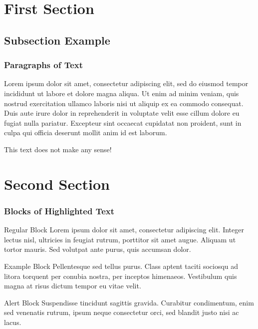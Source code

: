 \documentclass[aspectratio=169]{beamer}
\begin{document}
\section{First Section}

\subsection{Subsection Example} 

\begin{frame}
\frametitle{Paragraphs of Text}
Lorem ipsum dolor sit amet, consectetur adipiscing elit, sed do eiusmod tempor incididunt ut labore et dolore magna aliqua. Ut enim ad minim veniam, quis nostrud exercitation ullamco laboris nisi ut aliquip ex ea commodo consequat. Duis aute irure dolor in reprehenderit in voluptate velit esse cillum dolore eu fugiat nulla pariatur. Excepteur sint occaecat cupidatat non proident, sunt in culpa qui officia deserunt mollit anim id est laborum.

\alert{This text does not make any sense!}

\end{frame}


\section{Second Section} 

\begin{frame}
\frametitle{Blocks of Highlighted Text}
\begin{block}{Regular Block}
Lorem ipsum dolor sit amet, consectetur adipiscing elit. Integer lectus nisl, ultricies in feugiat rutrum, porttitor sit amet augue. Aliquam ut tortor mauris. Sed volutpat ante purus, quis accumsan dolor.
\end{block}

\begin{exampleblock}{Example Block}
Pellentesque sed tellus purus. Class aptent taciti sociosqu ad litora torquent per conubia nostra, per inceptos himenaeos. Vestibulum quis magna at risus dictum tempor eu vitae velit.
\end{exampleblock}

\begin{alertblock}{Alert Block}
Suspendisse tincidunt sagittis gravida. Curabitur condimentum, enim sed venenatis rutrum, ipsum neque consectetur orci, sed blandit justo nisi ac lacus.
\end{alertblock}
\end{frame}
\end{document}
